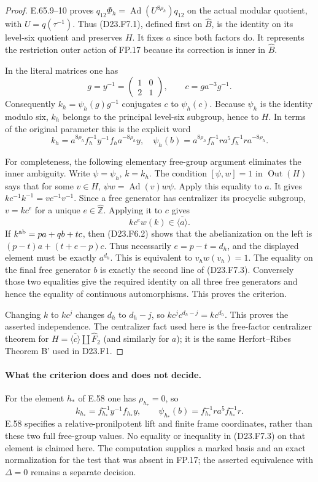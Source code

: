 \begin{proof}
E.65.9--10 proves
$q_{12}\Phi_h=\operatorname{Ad}(U^{8\rho_h})q_{12}$
on the actual modular quotient, with $U=q(\tau^{-1})$.
Thus (D23.F7.1), defined first on $\widehat B$, is the identity
on its level-six quotient and preserves $H$.  It fixes $a$
since both factors do.  It represents the restriction outer
action of FP.17 because its correction is inner in
$\widehat B$.

In the literal matrices one has
\[
 g=y^{-1}=\begin{pmatrix}1&0\\2&1\end{pmatrix},
 \qquad c=ga^{-3}g^{-1}.
\]
Consequently $k_h=\psi_h(g)g^{-1}$ conjugates $c$ to
$\psi_h(c)$.  Because $\psi_h$ is the identity modulo six,
$k_h$ belongs to the principal level-six subgroup, hence to
$H$.  In terms of the original parameter this is the explicit word
\[
 k_h=a^{8\rho_h}f_h^{-1}y^{-1}f_h a^{-8\rho_h}y,
 \quad
 \psi_h(b)=a^{8\rho_h}f_h^{-1}r a^5 f_h^{-1}r a^{-8\rho_h}.
 \tag{D23.F7.4}
\]

For completeness, the following elementary free-group argument
eliminates the inner ambiguity.  Write $\psi=\psi_h$, $k=k_h$.
The condition $[\psi,w]=1$ in $\operatorname{Out}(H)$ says
that for some $v\in H$,
$\psi w=\operatorname{Ad}(v)w\psi$.
Apply this equality to $a$.  It gives
$k c^{-1}k^{-1}=v c^{-1}v^{-1}$.  Since a free generator
has centralizer its procyclic subgroup, $v=kc^e$ for a
unique $e\in\widehat{\mathbb Z}$.
Applying it to $c$ gives
\[
 k c^e w(k)\in\overline{\langle a\rangle}.
\]
If $k^{\rm ab}=p a+q b+t c$, then (D23.F6.2) shows that
the abelianization on the left is
$(p-t)a+(t+e-p)c$.
Thus necessarily $e=p-t=d_h$, and the displayed element
must be exactly $a^{d_h}$.  This is equivalent to
$v_hw(v_h)=1$.  The equality on the final free generator
$b$ is exactly the second line of (D23.F7.3).
Conversely those two equalities give the required identity
on all three free generators and hence the equality of
continuous automorphisms.  This proves the criterion.

Changing $k$ to $kc^j$ changes $d_h$ to $d_h-j$, so
$kc^j c^{d_h-j}=kc^{d_h}$.  This proves the asserted
independence.  The centralizer fact used here is the
free-factor centralizer theorem for
$H=\overline{\langle c\rangle}\amalg\widehat F_2$
(and similarly for $a$); it is the same Herfort--Ribes
Theorem B' used in D23.F1.
\end{proof}

\paragraph{What the criterion does and does not decide.}
For the element $h_*$ of E.58 one has $\rho_{h_*}=0$, so
\[
 k_{h_*}=f_{h_*}^{-1}y^{-1}f_{h_*}y,
 \qquad \psi_{h_*}(b)=f_{h_*}^{-1}r a^5 f_{h_*}^{-1}r.
\]
E.58 specifies a relative-pronilpotent lift and finite frame
coordinates, rather than these two full free-group values.
No equality or inequality in (D23.F7.3) on that element is
claimed here.  The computation supplies a marked basis and
an exact normalization for the test that was absent in FP.17;
the asserted equivalence with $\Delta=0$ remains a separate
decision.

